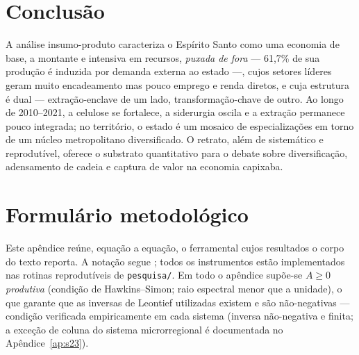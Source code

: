 \documentclass[11pt,a4paper]{article}
\begin{document}
\section{Conclusão}
\label{sec:conclusao}
A análise insumo-produto caracteriza o Espírito Santo como uma economia de base, a
montante e intensiva em recursos, \emph{puxada de fora} --- 61,7\% de sua produção é
induzida por demanda externa ao estado ---, cujos setores líderes geram muito encadeamento mas
pouco emprego e renda diretos, e cuja estrutura é dual --- extração-enclave de um lado,
transformação-chave de outro. Ao longo de 2010--2021, a celulose se fortalece, a
siderurgia oscila e a extração permanece pouco integrada; no território, o estado é um
mosaico de especializações em torno de um núcleo metropolitano diversificado. O retrato, além
de sistemático e reprodutível, oferece o substrato quantitativo para o debate sobre
diversificação, adensamento de cadeia e captura de valor na economia capixaba.

\appendix
\section{Formulário metodológico}
\label{ap:metodologia}
Este apêndice reúne, equação a equação, o ferramental cujos resultados o corpo do texto
reporta. A notação segue \citet{millerblair2009}; todos os instrumentos estão implementados
nas rotinas reprodutíveis de \texttt{pesquisa/}. Em todo o apêndice supõe-se $A\ge 0$
\emph{produtiva} (condição de Hawkins--Simon; raio espectral menor que a unidade), o que
garante que as inversas de Leontief utilizadas existem e são não-negativas --- condição
verificada empiricamente em cada sistema (inversa não-negativa e finita; a exceção de
coluna do sistema microrregional é documentada no Apêndice~\ref{ap:s23}).
\end{document}
